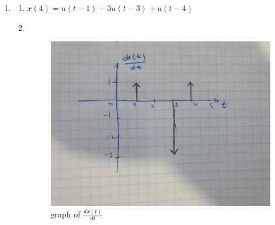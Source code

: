 \documentclass[10pt,a4paper, margin=1in]{article}
\begin{document}
\begin{enumerate}
    \item %
          \begin{enumerate}
              \item %
              $x(4) = u(t - 1) - 3u(t - 3) + u (t - 4)$
              \item %
              ~\\
              \begin{figure}[H]
              \centering
              \includegraphics[scale=0.25]{hw1_q5.jpg}
              \caption{graph of $\frac{dx(t)}{dt}$}
                \end{figure}
          \end{enumerate}


\end{enumerate}
\end{document}
